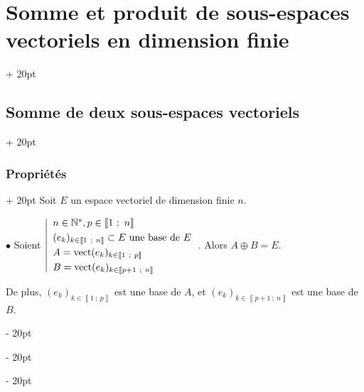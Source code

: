 \documentclass[a4paper, 12pt, twoside]{article}
\newcommand{\N}{\mathbb{N}} %
\newcommand{\nset}[2]{\left\llbracket #1\ ;\ #2 \right\rrbracket}
\newcommand{\ind}[1][20pt]{\advance\leftskip + #1}
\newcommand{\deind}[1][20pt]{\advance\leftskip - #1}
\newenvironment{indt}[2][20pt]{#2 \par \ind[#1]}{\par \deind} %
\begin{document}
    \begin{indt}{\section{Somme et produit de sous-espaces vectoriels en dimension finie}}
        
        \begin{indt}{\subsection{Somme de deux sous-espaces vectoriels}}
            \begin{indt}{\subsubsection{Propriétés}}
                Soit $E$ un espace vectoriel de dimension finie $n$.
                
                \vspace{6pt}
                
                $\bullet$ Soient
                $
                    \left|
                    \begin{array}{l}
                        n \in \N^*, p \in \nset 1 n
                        \vspace{3pt}
                        \\
                        (e_k)_{k \in \nset 1 n} \subset E\ \text{une base de $E$}
                        \vspace{3pt}
                        \\
                        A = \mathrm{vect}(e_k)_{k \in \nset 1 p}
                        \vspace{3pt}
                        \\
                        B = \mathrm{vect}(e_k)_{k \in \nset{p + 1}{n}}
                    \end{array}
                    \right.
                $. Alors $A \oplus B = E$.
                
                \vspace{6pt}
                
                De plus, $(e_k)_{k \in \nset 1 p}$ est une base de $A$, et $(e_k)_{k \in \nset{p + 1}{n}}$ est une base de $B$.
                
                \vspace{12pt}
                

\end{indt}
\end{indt}
\end{indt}
\end{document}
